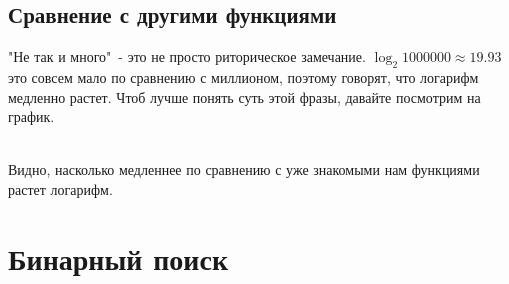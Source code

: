 \documentclass[12pt]{article} %
\begin{document}
\subsection{Сравнение с другими функциями}
"Не так и много"\ - это не просто риторическое замечание. $\log_2{1000000} \approx 19.93$ это совсем мало по сравнению с миллионом, поэтому говорят, что логарифм медленно растет. Чтоб лучше понять суть этой фразы, давайте посмотрим на график.\\
\\

Видно, насколько медленнее по сравнению с уже знакомыми нам функциями растет логарифм.

\section{Бинарный поиск}
\end{document}
